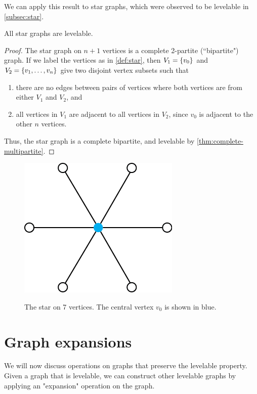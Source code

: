 We can apply this result to star graphs, which were observed to be levelable in \autoref{subsec:star}.

\begin{corollary}
All star graphs are levelable.
\end{corollary}

\begin{proof}
The star graph on $n+1$ vertices is a complete 2-partite (``bipartite") graph. If we label the vertices as in \autoref{def:star}, then $V_1 = \{ v_0 \}$  and $V_2 = \{ v_1, \dots, v_{n} \}$ give two disjoint vertex subsets such that 

\begin{enumerate}
\item there are no edges between pairs of vertices where both vertices are from either $V_1$ and $V_2$, and
\item all vertices in $V_1$ are adjacent to all vertices in $V_2$, since $v_0$ is adjacent to the other $n$ vertices.
\end{enumerate}

Thus, the star graph is a complete bipartite, and levelable by \autoref{thm:complete-multipartite}.
\end{proof}

\begin{figure}[bth]
    \myfloatalign
    {\includegraphics[width=.3\linewidth]{figures/star.png}} 
    \caption{The star on 7 vertices. The central vertex $v_0$ is shown in blue.}
\end{figure}




\section{Graph expansions}
We will now discuss operations on graphs that preserve the levelable property. Given a graph that is levelable, we can construct other levelable graphs by applying an "expansion" operation on the graph.

